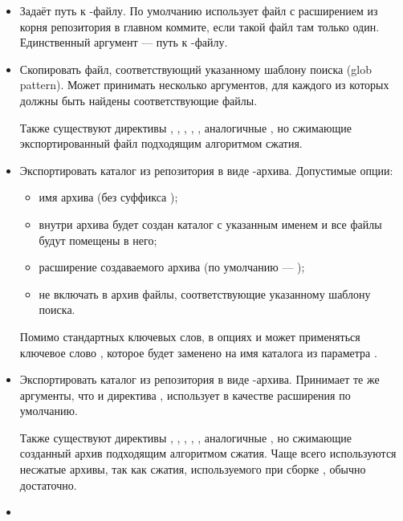 \begin{itemize}
	\item {}
	
	Задаёт путь к -файлу. По умолчанию  использует файл с
		расширением  из корня репозитория в главном коммите,
		если такой файл там только один. Единственный аргумент --- путь к -файлу.
	
	\item {}
	Скопировать файл, соответствующий указанному шаблону поиска (glob pattern).
		Может принимать несколько аргументов, для каждого из которых должны
		быть найдены соответствующие файлы.
	
	Также существуют директивы , , , , ,
		аналогичные , но сжимающие экспортированный файл подходящим алгоритмом сжатия.
	\item  {}

	Экспортировать каталог из репозитория в виде -архива. Допустимые опции:
	\begin{itemize}
		\item {} имя архива (без суффикса );
		\item {} внутри архива будет создан каталог с указанным именем
			и все файлы будут помещены в него;
		\item {} расширение создаваемого архива (по умолчанию --- );
		\item {} не включать в архив файлы, соответствующие указанному шаблону поиска.
	\end{itemize}
	
	Помимо стандартных ключевых слов, в опциях  и  может применяться ключевое
		слово , которое будет заменено на имя каталога из параметра .
	\item {}
	
	Экспортировать каталог из репозитория в виде -архива. Принимает те же аргументы,
		что и директива , использует  в качестве расширения по умолчанию.
	
		Также существуют директивы , , , , , аналогичные
		, но сжимающие созданный архив подходящим алгоритмом сжатия. Чаще всего используются
		несжатые архивы, так как сжатия, используемого при сборке , обычно достаточно.
	\item  {}
	

\end{itemize}
